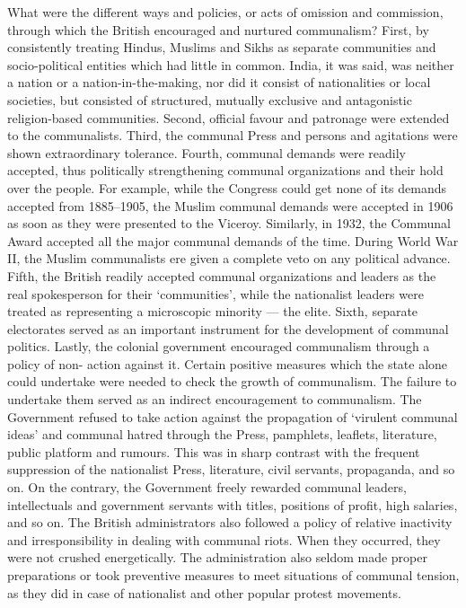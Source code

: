 \begin{multicols}{2}
What were the different ways and policies, or acts of omission and commission, through which the British encouraged and nurtured communalism? First, by consistently treating Hindus, Muslims and Sikhs as separate communities and socio-political entities which had little in common. India, it was said, was neither a nation or a nation-in-the-making, nor did it consist of nationalities or local societies, but consisted of structured, mutually exclusive and antagonistic religion-based communities. Second, official favour and patronage were extended to the communalists. Third, the communal Press and persons and agitations were shown extraordinary tolerance. Fourth, communal demands were readily accepted, thus politically strengthening communal organizations and their hold over the people. For example, while the Congress could get none of its demands accepted from 1885--1905, the Muslim communal demands were accepted in 1906 as soon as they were presented to the Viceroy. Similarly, in 1932, the Communal Award accepted all the major communal demands of the time. During World War II, the Muslim communalists ere given a complete veto on any political advance. Fifth, the British readily accepted communal organizations and leaders as the real spokesperson for their `communities', while the nationalist leaders were treated as representing a microscopic minority --- the elite. Sixth, separate electorates served as an important instrument for the development of communal politics. Lastly, the colonial government encouraged communalism through a policy of non- action against it. Certain positive measures which the state alone could undertake were needed to check the growth of communalism. The failure to undertake them served as an indirect encouragement to communalism. The Government refused to take action against the propagation of `virulent communal ideas' and communal hatred through the Press, pamphlets, leaflets, literature, public platform and rumours. This was in sharp contrast with the frequent suppression of the nationalist Press, literature, civil servants, propaganda, and so on. On the contrary, the Government freely rewarded communal leaders, intellectuals and government servants with titles, positions of profit, high salaries, and so on. The British administrators also followed a policy of relative inactivity and irresponsibility in dealing with communal riots. When they occurred, they were not crushed energetically. The administration also seldom made proper preparations or took preventive measures to meet situations of communal tension, as they did in case of nationalist and other popular protest movements.


\end{multicols}
